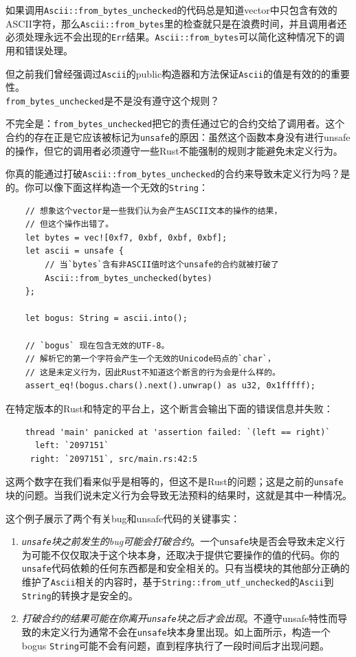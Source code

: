 如果调用\texttt{Ascii::from\_bytes\_unchecked}的代码总是知道vector中只包含有效的ASCII字符，那么\texttt{Ascii::from\_bytes}里的检查就只是在浪费时间，并且调用者还必须处理永远不会出现的\texttt{Err}结果。\texttt{Ascii::from\_bytes}可以简化这种情况下的调用和错误处理。

但之前我们曾经强调过\texttt{Ascii}的public构造器和方法保证\texttt{Ascii}的值是有效的的重要性。\\
\texttt{from\_bytes\_unchecked}是不是没有遵守这个规则？

不完全是：\texttt{from\_bytes\_unchecked}把它的责任通过它的合约交给了调用者。这个合约的存在正是它应该被标记为\texttt{unsafe}的原因：虽然这个函数本身没有进行unsafe的操作，但它的调用者必须遵守一些Rust不能强制的规则才能避免未定义行为。

你真的能通过打破\texttt{Ascii::from\_bytes\_unchecked}的合约来导致未定义行为吗？是的。你可以像下面这样构造一个无效的\texttt{String}：
\begin{verbatim}
    // 想象这个vector是一些我们认为会产生ASCII文本的操作的结果，
    // 但这个操作出错了。
    let bytes = vec![0xf7, 0xbf, 0xbf, 0xbf];
    let ascii = unsafe {
        // 当`bytes`含有非ASCII值时这个unsafe的合约就被打破了
        Ascii::from_bytes_unchecked(bytes)
    };

    let bogus: String = ascii.into();

    // `bogus` 现在包含无效的UTF-8。
    // 解析它的第一个字符会产生一个无效的Unicode码点的`char`，
    // 这是未定义行为，因此Rust不知道这个断言的行为会是什么样的。
    assert_eq!(bogus.chars().next().unwrap() as u32, 0x1fffff);
\end{verbatim}

在特定版本的Rust和特定的平台上，这个断言会输出下面的错误信息并失败：
\begin{verbatim}
    thread 'main' panicked at 'assertion failed: `(left == right)`
      left: `2097151`
     right: `2097151`, src/main.rs:42:5
\end{verbatim}

这两个数字在我们看来似乎是相等的，但这不是Rust的问题；这是之前的\texttt{unsafe}块的问题。当我们说未定义行为会导致无法预料的结果时，这就是其中一种情况。

这个例子展示了两个有关bug和unsafe代码的关键事实：
\begin{enumerate}
    \item \emph{\texttt{unsafe}块之前发生的bug可能会打破合约}。一个\texttt{unsafe}块是否会导致未定义行为可能不仅仅取决于这个块本身，还取决于提供它要操作的值的代码。你的\texttt{unsafe}代码依赖的任何东西都是和安全相关的。只有当模块的其他部分正确的维护了\texttt{Ascii}相关的内容时，基于\texttt{String::from\_utf\_unchecked}的\texttt{Ascii}到\texttt{String}的转换才是安全的。
    \item \emph{打破合约的结果可能在你离开\texttt{unsafe}块之后才会出现}。不遵守unsafe特性而导致的未定义行为通常不会在\texttt{unsafe}块本身里出现。如上面所示，构造一个bogus \texttt{String}可能不会有问题，直到程序执行了一段时间后才出现问题。
\end{enumerate}

